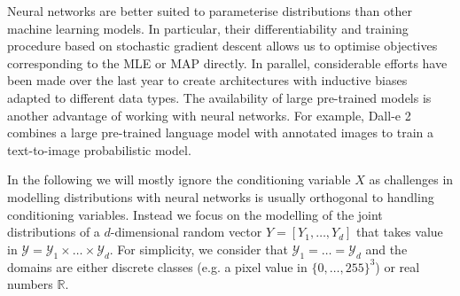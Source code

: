 Neural networks are better suited to parameterise distributions than other machine learning models. In particular, their differentiability and training procedure based on stochastic gradient descent allows us to optimise objectives corresponding to the MLE or MAP directly. In parallel, considerable efforts have been made over the last year to create architectures with inductive biases adapted to different data types. The availability of large pre-trained models is another advantage of working with neural networks. For example, Dall-e 2~\citep{ramesh2022hierarchical} combines a large pre-trained language model with annotated images to train a text-to-image probabilistic model.

In the following we will mostly ignore the conditioning variable $X$ as challenges in modelling distributions with neural networks is usually orthogonal to handling conditioning variables. Instead we focus on the modelling of the joint distributions of a $d$-dimensional random vector $Y = \left[Y_1, \dots, Y_d  \right]$ that takes value in $\mathcal{Y} = \mathcal{Y}_1 \times \dots \times \mathcal{Y}_d$. For simplicity, we consider that $\mathcal{Y}_1 = \dots = \mathcal{Y}_d$ and the domains are either discrete classes (e.g. a pixel value in $\{0, \dots, 255\}^3$) or real numbers $\mathbb{R}$.
